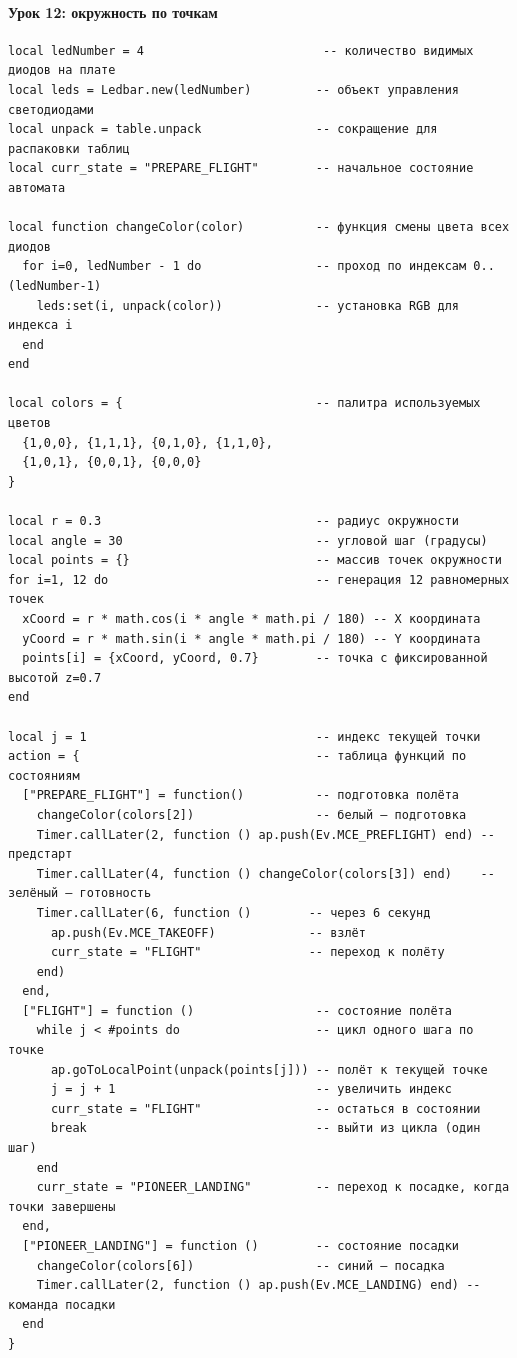 \paragraph{Урок 12: окружность по точкам}
\begin{verbatim}
local ledNumber = 4                         -- количество видимых диодов на плате
local leds = Ledbar.new(ledNumber)         -- объект управления светодиодами
local unpack = table.unpack                -- сокращение для распаковки таблиц
local curr_state = "PREPARE_FLIGHT"        -- начальное состояние автомата

local function changeColor(color)          -- функция смены цвета всех диодов
  for i=0, ledNumber - 1 do                -- проход по индексам 0..(ledNumber-1)
    leds:set(i, unpack(color))             -- установка RGB для индекса i
  end
end

local colors = {                           -- палитра используемых цветов
  {1,0,0}, {1,1,1}, {0,1,0}, {1,1,0},
  {1,0,1}, {0,0,1}, {0,0,0}
}

local r = 0.3                              -- радиус окружности
local angle = 30                           -- угловой шаг (градусы)
local points = {}                          -- массив точек окружности
for i=1, 12 do                             -- генерация 12 равномерных точек
  xCoord = r * math.cos(i * angle * math.pi / 180) -- X координата
  yCoord = r * math.sin(i * angle * math.pi / 180) -- Y координата
  points[i] = {xCoord, yCoord, 0.7}        -- точка с фиксированной высотой z=0.7
end

local j = 1                                -- индекс текущей точки
action = {                                 -- таблица функций по состояниям
  ["PREPARE_FLIGHT"] = function()          -- подготовка полёта
    changeColor(colors[2])                 -- белый — подготовка
    Timer.callLater(2, function () ap.push(Ev.MCE_PREFLIGHT) end) -- предстарт
    Timer.callLater(4, function () changeColor(colors[3]) end)    -- зелёный — готовность
    Timer.callLater(6, function ()        -- через 6 секунд
      ap.push(Ev.MCE_TAKEOFF)             -- взлёт
      curr_state = "FLIGHT"               -- переход к полёту
    end)
  end,
  ["FLIGHT"] = function ()                 -- состояние полёта
    while j < #points do                   -- цикл одного шага по точке
      ap.goToLocalPoint(unpack(points[j])) -- полёт к текущей точке
      j = j + 1                            -- увеличить индекс
      curr_state = "FLIGHT"                -- остаться в состоянии
      break                                -- выйти из цикла (один шаг)
    end
    curr_state = "PIONEER_LANDING"         -- переход к посадке, когда точки завершены
  end,
  ["PIONEER_LANDING"] = function ()        -- состояние посадки
    changeColor(colors[6])                 -- синий — посадка
    Timer.callLater(2, function () ap.push(Ev.MCE_LANDING) end) -- команда посадки
  end
}


\end{verbatim}
